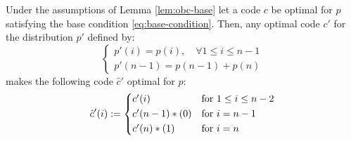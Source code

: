 \documentclass[toc, titlepaged]{../cs-classes/cs-classes}
\begin{document}
\begin{lemma}
    \label{lem:recursive-step}
    Under the assumptions of Lemma \ref{lem:obc-base} let a code $c$ be optimal for $p$ satisfying the base condition \eqref{eq:base-condition}. Then, any optimal code $c'$ for the distribution $p'$ defined by:
    \begin{equation*}
        \begin{cases*}
            p'(i) = p(i), \quad \forall 1\leq i\leq n-1\\
            p'(n-1) = p(n-1) + p(n)
        \end{cases*}
    \end{equation*}
    makes the following code $\hat{c}'$ optimal for $p$:
    \begin{equation*}
        \hat{c}'(i) := 
        \begin{cases*}
            c'(i) & for $1\leq i\leq n-2$\\
            c'(n-1) * (0) & for $i=n-1$\\
            c'(n) * (1) & for $i=n$
        \end{cases*}
    \end{equation*}
\end{lemma}
\end{document}
